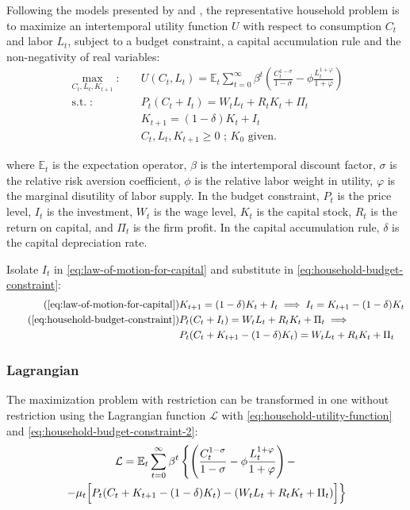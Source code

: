\documentclass[
	12pt, 
	]{article}
\numberwithin{equation}{section}
\DeclareMathOperator{\st}{s.t.}
\newcommand{\E}[1][t]{{\mathbb{E}_{#1}}}
\theoremstyle{definition}
\theoremstyle{plain}
\theoremstyle{plain}
\theoremstyle{plain}
\begin{document}
Following the models presented by \textcite{costa_junior_understanding_2016} and \textcite{solis-garcia_ucb_2022}, the representative household problem is to maximize an intertemporal utility function $U$ with respect to consumption $C_t$ and labor $L_t$, subject to a budget constraint, a capital accumulation rule and the non-negativity of real variables:
\begin{align}
\label{eq:household-utility-function}
	\max_{C_t,L_t,K_{t+1}}: \quad & U(C_t,L_t) = \E \sum_{t=0}^{\infty} \beta^t \left(\frac{C_t^{1-\sigma}}{1-\sigma} - \phi \frac{L_t^{1+\varphi}}{1+\varphi} \right) \\
\label{eq:household-budget-constraint}
	\st: \quad & P_t (C_t + I_t) = W_t L_t + R_t K_t + \Pi_t \\
\label{eq:law-of-motion-for-capital}
	\quad & K_{t+1} = (1-\delta)K_t + I_t \\
	\quad & C_t,L_t,K_{t+1} \geq 0 \text{ ; $K_0$ given.} \nonumber
\end{align}

where $\E$ is the expectation operator, $\beta$ is the intertemporal discount factor, $\sigma$ is the relative risk aversion coefficient, $\phi$ is the relative labor weight in utility, $\varphi$ is the marginal disutility of labor supply. In the budget constraint, $P_t$ is the price level, $I_t$ is the investment, $W_t$ is the wage level, $K_t$ is the capital stock, $R_t$ is the return on capital, and $\Pi_t$ is the firm profit. In the capital accumulation rule, $\delta$ is the capital depreciation rate.

Isolate $I_t$ in \ref{eq:law-of-motion-for-capital} and substitute in \ref{eq:household-budget-constraint}:
\begin{align}
\tag{\ref{eq:law-of-motion-for-capital}}
	& K_{t+1} = (1-\delta)K_t + I_t \implies I_t = K_{t+1} - (1-\delta)K_t \\
\tag{\ref{eq:household-budget-constraint}}
	& P_t (C_t + I_t) = W_t L_t + R_t K_t + \Pi_t \implies \\
\label{eq:household-budget-constraint-2}
	& P_t (C_t + K_{t+1} - (1-\delta)K_t) = W_t L_t + R_t K_t + \Pi_t
\end{align}

\subsubsection*{Lagrangian}

The maximization problem with restriction can be transformed in one without restriction using the Lagrangian function $\mathcal{L}$ with \ref{eq:household-utility-function} and \ref{eq:household-budget-constraint-2}:
\begin{multline}
\label{eq:household-lagrangian}
	\mathcal{L} = \mathbb{E}_t \sum_{t=0}^{\infty} \beta^t 
	\left\{ \left( \frac{C_t^{1-\sigma}}{1-\sigma} - \phi \frac{L_t^{1+\varphi}}{1+\varphi} \right) - \right.
\\
	\left. -\mu_t \Bigr[ P_t (C_t + K_{t+1} - (1-\delta) K_t) - (W_t L_t + R_t K_t + \Pi_t) \Bigl] \right\}
\end{multline}
\end{document}
